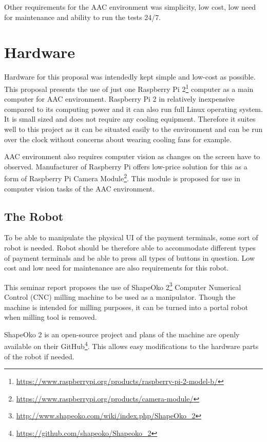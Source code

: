 Other requirements for the AAC environment was simplicity, low cost, low need for maintenance and ability to run the tests 24/7.

\section{Hardware}
\label{section:Proposed hardware}

Hardware for this proposal was intendedly kept simple and low-cost as possible. This proposal presents the use of just one Raspberry Pi 2\footnote{\url{https://www.raspberrypi.org/products/raspberry-pi-2-model-b/}} computer as a main computer for AAC environment. Raspberry Pi 2 in relatively inexpensive compared to its computing power and it can also run full Linux operating system. It is small sized and does not require any cooling equipment. Therefore it suites well to this project as it can be situated easily to the environment and can be run over the clock without concerns about wearing cooling fans for example.

AAC environment also requires computer vision as changes on the screen have to observed. Manufacturer of Raspberry Pi offers low-price solution for this as a form of Raspberry Pi Camera Module\footnote{\url{https://www.raspberrypi.org/products/camera-module/}}. This module is proposed for use in computer vision tasks of the AAC environment.

\FloatBarrier
\subsection{The Robot}

To be able to manipulate the physical UI of the payment terminals, some sort of robot is needed. Robot should be therefore able to accommodate different types of payment terminals and be able to press all types of buttons in question. Low cost and low need for maintenance are also requirements for this robot.

This seminar report proposes the use of ShapeOko 2\footnote{\url{http://www.shapeoko.com/wiki/index.php/ShapeOko_2}} Computer Numerical Control (CNC) milling machine to be used as a manipulator. Though the machine is intended for milling purposes, it can be turned into a portal robot when milling tool is removed.

ShapeOko 2 is an open-source project and plans of the machine are openly available on their GitHub\footnote{\url{https://github.com/shapeoko/Shapeoko_2}}. This allows easy modifications to the hardware parts of the robot if needed.

